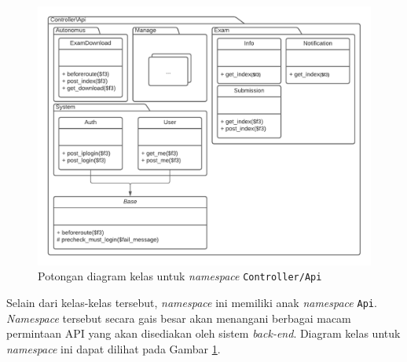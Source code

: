    \begin{figure}
        \centering
        \includegraphics[width=0.75\paperwidth]{Gambar/classmap-be/Classmap - app-controller-api.pdf}
        \caption{Potongan diagram kelas untuk \textit{namespace}
        \texttt{Controller/Api}}
        \label{fig:classmap_app-controller-api}
    \end{figure}
    
    Selain dari kelas-kelas tersebut, \textit{namespace} ini memiliki anak
    \textit{namespace} \texttt{Api}. \textit{Namespace} tersebut secara gais
    besar akan menangani berbagai macam permintaan API yang akan disediakan oleh
    sistem \textit{back-end}. Diagram kelas untuk \textit{namespace} ini dapat
    dilihat pada Gambar \ref{fig:classmap_app-controller-api}.
    
